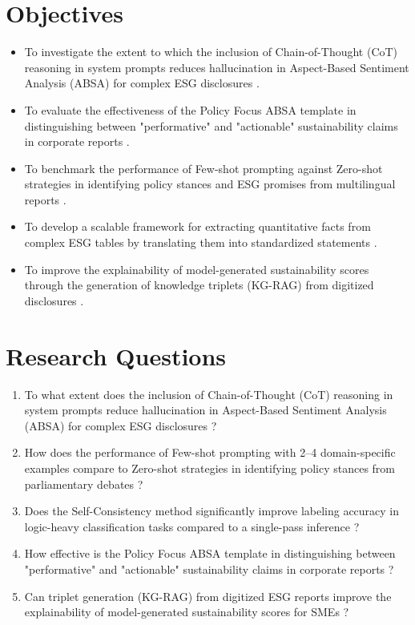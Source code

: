 \documentclass{article}
\begin{document}
\section{Objectives}
\begin{itemize}
\item To investigate the extent to which the inclusion of Chain-of-Thought (CoT) reasoning in system prompts reduces hallucination in Aspect-Based Sentiment Analysis (ABSA) for complex ESG disclosures \citep{RQ: Research Questions}.
\item To evaluate the effectiveness of the Policy Focus ABSA template in distinguishing between "performative" and "actionable" sustainability claims in corporate reports \citep{RQ: Research Questions}.
\item To benchmark the performance of Few-shot prompting against Zero-shot strategies in identifying policy stances and ESG promises from multilingual reports \citep{RQ: Research Questions, Multilingual Promise Verification in ESG Reports with Large Language Model Performance Evaluation}.
\item To develop a scalable framework for extracting quantitative facts from complex ESG tables by translating them into standardized statements \citep{Statements: Universal Information Extraction from Tables with Large Language Models for ESG KPIs}.
\item To improve the explainability of model-generated sustainability scores through the generation of knowledge triplets (KG-RAG) from digitized disclosures \citep{RQ: Research Questions}.
\end{itemize}

\section{Research Questions}
\begin{enumerate}
\item To what extent does the inclusion of Chain-of-Thought (CoT) reasoning in system prompts reduce hallucination in Aspect-Based Sentiment Analysis (ABSA) for complex ESG disclosures \citep{RQ: Research Questions}?
\item How does the performance of Few-shot prompting with 2–4 domain-specific examples compare to Zero-shot strategies in identifying policy stances from parliamentary debates \citep{RQ: Research Questions}?
\item Does the Self-Consistency method significantly improve labeling accuracy in logic-heavy classification tasks compared to a single-pass inference \citep{RQ: Research Questions}?
\item How effective is the Policy Focus ABSA template in distinguishing between "performative" and "actionable" sustainability claims in corporate reports \citep{RQ: Research Questions}?
\item Can triplet generation (KG-RAG) from digitized ESG reports improve the explainability of model-generated sustainability scores for SMEs \citep{RQ: Research Questions}?
\end{enumerate}
\end{document}

